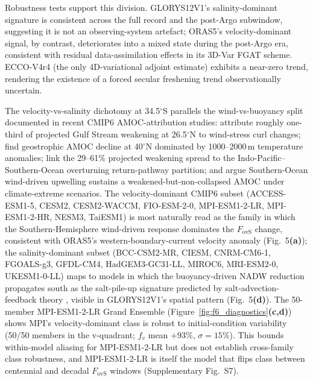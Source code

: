 \documentclass[11pt,a4paper]{article}
\begin{document}
Robustness tests support this division. GLORYS12V1's salinity-dominant signature is consistent across the full record and the post-Argo subwindow, suggesting it is not an observing-system artefact; ORAS5's velocity-dominant signal, by contrast, deteriorates into a mixed state during the post-Argo era, consistent with residual data-assimilation effects in its 3D-Var FGAT scheme. ECCO-V4r4 (the only 4D-variational adjoint estimate) exhibits a near-zero trend, rendering the existence of a forced secular freshening trend observationally uncertain.

The velocity-vs-salinity dichotomy at 34.5$^\circ$S parallels the wind-vs-buoyancy split documented in recent CMIP6 AMOC-attribution studies: \citet{Asbjornsen2023} attribute roughly one-third of projected Gulf Stream weakening at 26.5$^\circ$N to wind-stress curl changes; \citet{Levang2020} find geostrophic AMOC decline at 40$^\circ$N dominated by 1000--2000\,m temperature anomalies; \citet{Baker2023} link the 29--61\% projected weakening spread to the Indo-Pacific--Southern-Ocean overturning return-pathway partition; and \citet{Baker2025} argue Southern-Ocean wind-driven upwelling sustains a weakened-but-non-collapsed AMOC under climate-extreme scenarios. The velocity-dominant CMIP6 subset (ACCESS-ESM1-5, CESM2, CESM2-WACCM, FIO-ESM-2-0, MPI-ESM1-2-LR, MPI-ESM1-2-HR, NESM3, TaiESM1) is most naturally read as the family in which the Southern-Hemisphere wind-driven response dominates the $F_{\mathrm{ovS}}$ change, consistent with ORAS5's western-boundary-current velocity anomaly (Fig.~5\textbf{(a)}); the salinity-dominant subset (BCC-CSM2-MR, CIESM, CNRM-CM6-1, FGOALS-g3, GFDL-CM4, HadGEM3-GC31-LL, MIROC6, MRI-ESM2-0, UKESM1-0-LL) maps to models in which the buoyancy-driven NADW reduction propagates south as the salt-pile-up signature predicted by salt-advection-feedback theory \citep{Stommel1961, deVriesWeber2005}, visible in GLORYS12V1's spatial pattern (Fig.~5\textbf{(d)}). The 50-member MPI-ESM1-2-LR Grand Ensemble (Figure~\ref{fig:f6_diagnostics}\textbf{(c,d)}) shows MPI's velocity-dominant class is robust to initial-condition variability (50/50 members in the v-quadrant; $f_v$ mean $+93\%$, $\sigma = 15\%$). This bounds within-model aliasing for MPI-ESM1-2-LR but does not establish cross-family class robustness, and MPI-ESM1-2-LR is itself the model that flips class between centennial and decadal $F_{\mathrm{ovS}}$ windows (Supplementary Fig.~S7).
\end{document}
